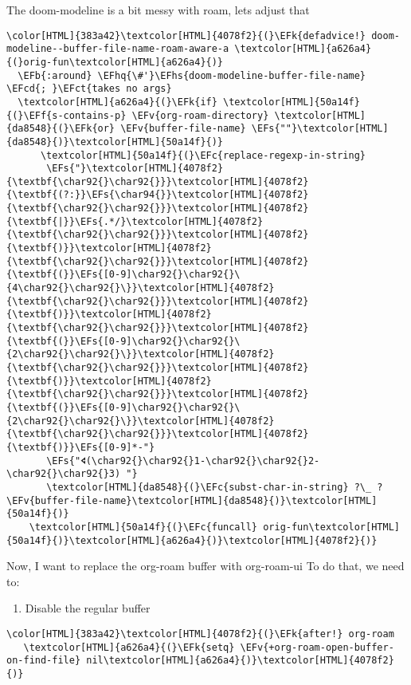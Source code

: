 \documentclass{scrartcl}
\newcommand{\EFk}[1]{\textcolor{EFk}{#1}} %
\newcommand{\EFs}[1]{\textcolor{EFs}{#1}} %
\newcommand{\EFb}[1]{\textcolor{EFb}{#1}} %
\newcommand{\EFct}[1]{\textcolor{EFct}{#1}} %
\newcommand{\EFc}[1]{\textcolor{EFc}{#1}} %
\newcommand{\EFv}[1]{\textcolor{EFv}{#1}} %
\newcommand{\EFf}[1]{\textcolor{EFf}{#1}} %
\newcommand{\EFcd}[1]{\textcolor{EFcd}{#1}} %
\newcommand{\EFhq}[1]{\textcolor{EFhq}{#1}} %
\newcommand{\EFhs}[1]{\textcolor{EFhs}{#1}} %
\begin{document}
The doom-modeline is a bit messy with roam, lets adjust that
\begin{Code}
\begin{Verbatim}[]
\color[HTML]{383a42}\textcolor[HTML]{4078f2}{(}\EFk{defadvice!} doom-modeline--buffer-file-name-roam-aware-a \textcolor[HTML]{a626a4}{(}orig-fun\textcolor[HTML]{a626a4}{)}
  \EFb{:around} \EFhq{\#'}\EFhs{doom-modeline-buffer-file-name} \EFcd{; }\EFct{takes no args}
  \textcolor[HTML]{a626a4}{(}\EFk{if} \textcolor[HTML]{50a14f}{(}\EFf{s-contains-p} \EFv{org-roam-directory} \textcolor[HTML]{da8548}{(}\EFk{or} \EFv{buffer-file-name} \EFs{""}\textcolor[HTML]{da8548}{)}\textcolor[HTML]{50a14f}{)}
      \textcolor[HTML]{50a14f}{(}\EFc{replace-regexp-in-string}
       \EFs{"}\textcolor[HTML]{4078f2}{\textbf{\char92{}\char92{}}}\textcolor[HTML]{4078f2}{\textbf{(?:}}\EFs{\char94{}}\textcolor[HTML]{4078f2}{\textbf{\char92{}\char92{}}}\textcolor[HTML]{4078f2}{\textbf{|}}\EFs{.*/}\textcolor[HTML]{4078f2}{\textbf{\char92{}\char92{}}}\textcolor[HTML]{4078f2}{\textbf{)}}\textcolor[HTML]{4078f2}{\textbf{\char92{}\char92{}}}\textcolor[HTML]{4078f2}{\textbf{(}}\EFs{[0-9]\char92{}\char92{}\{4\char92{}\char92{}\}}\textcolor[HTML]{4078f2}{\textbf{\char92{}\char92{}}}\textcolor[HTML]{4078f2}{\textbf{)}}\textcolor[HTML]{4078f2}{\textbf{\char92{}\char92{}}}\textcolor[HTML]{4078f2}{\textbf{(}}\EFs{[0-9]\char92{}\char92{}\{2\char92{}\char92{}\}}\textcolor[HTML]{4078f2}{\textbf{\char92{}\char92{}}}\textcolor[HTML]{4078f2}{\textbf{)}}\textcolor[HTML]{4078f2}{\textbf{\char92{}\char92{}}}\textcolor[HTML]{4078f2}{\textbf{(}}\EFs{[0-9]\char92{}\char92{}\{2\char92{}\char92{}\}}\textcolor[HTML]{4078f2}{\textbf{\char92{}\char92{}}}\textcolor[HTML]{4078f2}{\textbf{)}}\EFs{[0-9]*-"}
       \EFs{"🢔(\char92{}\char92{}1-\char92{}\char92{}2-\char92{}\char92{}3) "}
       \textcolor[HTML]{da8548}{(}\EFc{subst-char-in-string} ?\_ ?  \EFv{buffer-file-name}\textcolor[HTML]{da8548}{)}\textcolor[HTML]{50a14f}{)}
    \textcolor[HTML]{50a14f}{(}\EFc{funcall} orig-fun\textcolor[HTML]{50a14f}{)}\textcolor[HTML]{a626a4}{)}\textcolor[HTML]{4078f2}{)}
\end{Verbatim}
\end{Code}


Now, I want to replace the org-roam buffer with org-roam-ui
To do that, we need to:

\begin{enumerate}
\item Disable the regular buffer
\end{enumerate}
\begin{Code}
\begin{Verbatim}[]
\color[HTML]{383a42}\textcolor[HTML]{4078f2}{(}\EFk{after!} org-roam
   \textcolor[HTML]{a626a4}{(}\EFk{setq} \EFv{+org-roam-open-buffer-on-find-file} nil\textcolor[HTML]{a626a4}{)}\textcolor[HTML]{4078f2}{)}
\end{Verbatim}
\end{Code}
\end{document}
